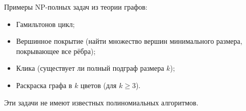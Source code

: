 \documentclass[12pt]{article}
\begin{document}
Примеры NP-полных задач из теории графов:
\begin{itemize}
    \item Гамильтонов цикл;
    \item Вершинное покрытие (найти множество вершин минимального размера, покрывающее все рёбра);
    \item Клика (существует ли полный подграф размера \(k\));
    \item Раскраска графа в \(k\) цветов (для \(k \ge 3\)).
\end{itemize}
Эти задачи не имеют известных полиномиальных алгоритмов.
\end{document}
